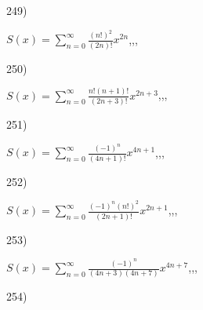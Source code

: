 \documentclass[11pt, ukrainian]{article}
\begin{document}
\par
\vspace{0.9cm}
249) \space 
{%
{$S(x)=\sum\limits_{n=0}^{\infty}{\frac{(n!)^2}{(2n)!}}{x^{{2n}}}$},,, \par \smallskip  
}
\par
\vspace{0.9cm}
250) \space 
{%
{$S(x)=\sum\limits_{n=0}^{\infty}{\frac{n!(n+1)!}{(2n+3)!}}{x^{{2n+3}}}$},,, \par \smallskip  
}
\par
\newpage
251) \space 
{%
{$S(x)=\sum\limits_{n=0}^{\infty}{\frac{(-1)^n}{(4n+1)!}}{x^{{4n+1}}}$},,, \par \smallskip  
}
\par
\vspace{0.9cm}
252) \space 
{%
{$S(x)=\sum\limits_{n=0}^{\infty}{\frac{{(-1)^n}{(n!)^2}}{(2n+1)!}}{x^{{2n+1}}}$},,, \par \smallskip  
}
\par
\vspace{0.9cm}
253) \space 
{%
{$S(x)=\sum\limits_{n=0}^{\infty}{\frac{(-1)^n}{(4n+3)(4n+7)}}{x^{{4n+7}}}$},,, \par \smallskip  
}
\par
\vspace{0.9cm}
254) \space 
\end{document}
